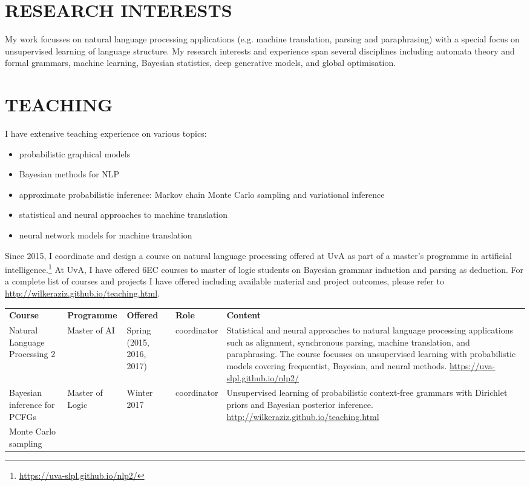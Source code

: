 \section*{RESEARCH INTERESTS}

My work focusses on natural language processing applications (e.g. machine translation, parsing and paraphrasing) with a special focus on unsupervised learning of language structure. 
My research interests and experience span several disciplines including automata theory and formal grammars, machine learning,  Bayesian statistics, deep generative models, and global optimisation.

\section*{TEACHING}

I have extensive teaching experience on various topics:
\begin{itemize}
	\item probabilistic graphical models
	\item Bayesian methods for NLP
	\item approximate probabilistic inference: Markov chain Monte Carlo sampling and variational inference
	\item statistical and neural approaches to machine translation
	\item neural network models for machine translation
\end{itemize}

Since 2015, I coordinate and design a course on natural language processing offered at UvA as part of a master's programme in artificial intelligence.\footnote{\url{https://uva-slpl.github.io/nlp2/}}
At UvA, I have offered 6EC courses to master of logic students on Bayesian grammar induction and parsing as deduction.
For a complete list of courses and projects I have offered including available material and project outcomes, please refer to \url{http://wilkeraziz.github.io/teaching.html}.

\begin{tabular}{p{2cm} l p{2cm} l p{6cm}}
\bf Course & \bf Programme & \bf Offered & \bf Role & \bf Content \\
Natural Language Processing 2 & Master of AI & Spring (2015, 2016, 2017) & coordinator & Statistical and neural approaches to natural language processing applications such as alignment, synchronous parsing, machine translation, and paraphrasing. The course focusses on unsupervised learning with probabilistic models covering frequentist, Bayesian, and neural methods. \url{https://uva-slpl.github.io/nlp2/} \\
Bayesian inference for PCFGs & Master of Logic & Winter 2017 & coordinator & Unsupervised learning of probabilistic context-free grammars with Dirichlet priors and Bayesian posterior inference. \url{http://wilkeraziz.github.io/teaching.html} \\
Monte Carlo sampling 
\end{tabular}

